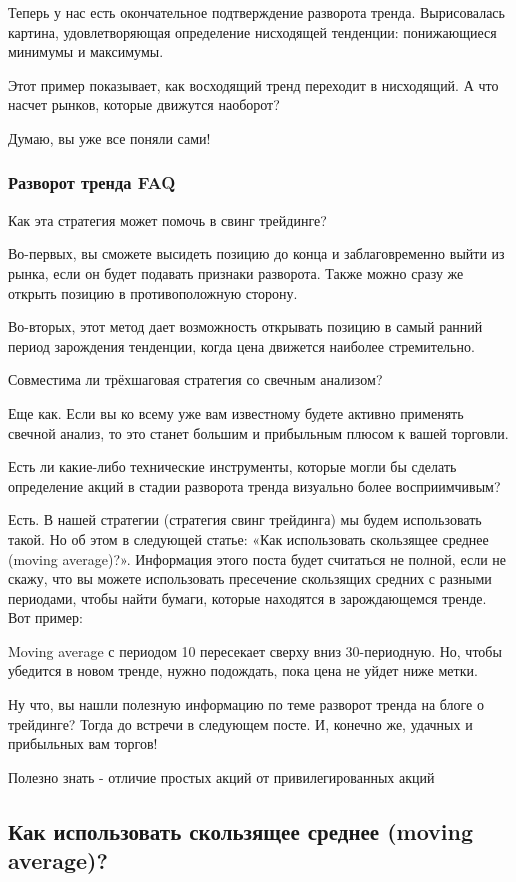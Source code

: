 \documentclass{book}
\begin{document}
Теперь у нас есть окончательное подтверждение разворота тренда. Вырисовалась картина, удовлетворяющая определение нисходящей тенденции: понижающиеся минимумы и максимумы.

Этот пример показывает, как восходящий тренд переходит в нисходящий. А что насчет  рынков, которые движутся наоборот?

Думаю, вы уже все поняли сами!

\subsubsection{Разворот тренда FAQ}

Как эта стратегия может помочь в свинг трейдинге?

Во-первых, вы сможете высидеть позицию до конца и заблаговременно выйти из рынка, если он будет подавать признаки разворота. Также можно сразу же открыть позицию в противоположную сторону.

Во-вторых, этот метод дает возможность открывать позицию в самый ранний период зарождения тенденции, когда цена движется наиболее стремительно.

Совместима ли трёхшаговая стратегия со свечным анализом?

Еще как. Если вы ко всему уже вам известному будете активно применять свечной анализ, то это станет большим и прибыльным плюсом к вашей торговли.

Есть ли какие-либо технические инструменты, которые могли бы сделать определение акций в стадии разворота тренда визуально более восприимчивым?

Есть. В нашей стратегии (стратегия свинг трейдинга) мы будем использовать такой. Но об этом в следующей статье: «Как использовать скользящее среднее (moving average)?». Информация этого поста будет считаться не полной, если не скажу, что вы можете использовать пресечение скользящих средних с разными периодами, чтобы найти бумаги, которые находятся в зарождающемся тренде. Вот пример:

Moving average с периодом 10 пересекает сверху вниз 30-периодную. Но, чтобы убедится в новом тренде, нужно подождать, пока цена не уйдет ниже метки.

Ну что, вы нашли полезную информацию по теме разворот тренда на блоге о трейдинге? Тогда до встречи в следующем посте. И, конечно же, удачных и прибыльных вам торгов!

Полезно знать - отличие простых акций от привилегированных акций

\subsection{Как использовать скользящее среднее (moving average)?}
\end{document}

